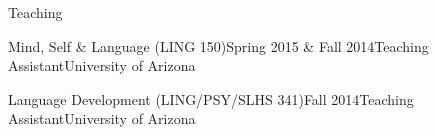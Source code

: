 \documentclass{resume} %
\begin{document}
\begin{rSection}{Teaching}

\begin{rSubsection}{Mind, Self \& Language (LING 150)}{Spring 2015 \& Fall 2014}{Teaching Assistant}{University of Arizona}
\item
\end{rSubsection}

\begin{rSubsection}{Language Development (LING/PSY/SLHS 341)}{Fall 2014}{Teaching Assistant}{University of Arizona}
\item 
\end{rSubsection}

\end{rSection}









\end{document}
